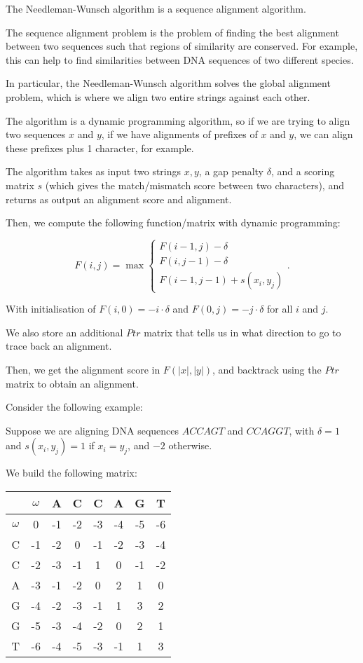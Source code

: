 


The Needleman-Wunsch algorithm is a sequence alignment algorithm.

The sequence alignment problem is the problem of finding the best alignment between two sequences such that regions of similarity are conserved. For example, this can help to find similarities between DNA sequences of two different species.

In particular, the Needleman-Wunsch algorithm solves the global alignment problem, which is where we align two entire strings against each other.

The algorithm is a dynamic programming algorithm, so if we are trying to align two sequences $x$ and $y$, if we have alignments of prefixes of $x$ and $y$, we can align these prefixes plus 1 character, for example.

The algorithm takes as input two strings $x, y$, a gap penalty $\delta$, and a scoring matrix $s$ (which gives the match/mismatch score between two characters), and returns as output an alignment score and alignment.

Then, we compute the following function/matrix with dynamic programming:

\[
  F(i,j) = \max\begin{cases}F(i-1, j) - \delta\\F(i, j-1) - \delta\\F(i-1, j-1)+ s(x_i, y_j)\end{cases}
.\] 

With initialisation of $F(i,0) = -i \cdot \delta$ and $F(0, j) = -j \cdot \delta$ for all $i$ and $j$.

We also store an additional $Ptr$ matrix that tells us in what direction to go to trace back an alignment.

Then, we get the alignment score in $F(|x|, |y|)$, and backtrack using the $Ptr$ matrix to obtain an alignment.

Consider the following example:

Suppose we are aligning DNA sequences $ACCAGT$ and $CCAGGT$, with $\delta = 1$ and $s(x_i, y_j) = 1$ if $x_i = y_j$, and $-2$ otherwise.

We build the following matrix:

\begin{tabular}{c|c|c|c|c|c|c|c}
  &$\omega$&A&C&C&A&G&T\\
  \hline
  $\omega$&0&-1&-2&-3&-4&-5&-6\\
  \hline
  C&-1&-2&0&-1&-2&-3&-4\\
  \hline
  C&-2&-3&-1&1&0&-1&-2\\
  \hline
  A&-3&-1&-2&0&2&1&0\\
  \hline
  G&-4&-2&-3&-1&1&3&2\\
  \hline
  G&-5&-3&-4&-2&0&2&1\\
  \hline
  T&-6&-4&-5&-3&-1&1&3
\end{tabular}

